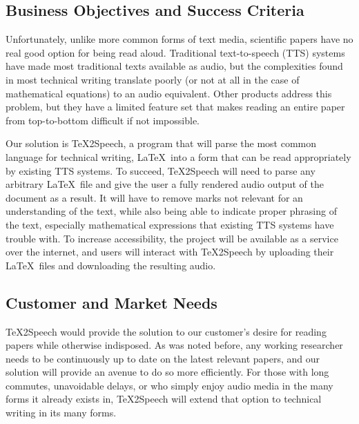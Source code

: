 \subsection{Business Objectives and Success Criteria}
\par
Unfortunately, unlike more common forms of text media, scientific papers have no real good option for being read aloud. Traditional text-to-speech (TTS) systems have made most traditional texts available as audio, but the complexities found in most technical writing translate poorly (or not at all in the case of mathematical equations) to an audio equivalent. Other products address this problem, but they have a limited feature set that makes reading an entire paper from top-to-bottom difficult if not impossible.\\
\par
\noindent Our solution is \TeX 2Speech, a program that will parse the most common language for technical writing, \LaTeX\, into a form that can be read appropriately by existing TTS systems. To succeed, \TeX 2Speech will need to parse any arbitrary \LaTeX\ file and give the user a fully rendered audio output of the document as a result. It will have to remove marks not relevant for an understanding of the text, while also being able to indicate proper phrasing of the text, especially mathematical expressions that existing TTS systems have trouble with. To increase accessibility, the project will be available as a service over the internet, and users will interact with \TeX 2Speech by uploading their \LaTeX\ files and downloading the resulting audio.

\subsection{Customer and Market Needs}
\TeX 2Speech would provide the solution to our customer’s desire for reading papers while otherwise indisposed. As was noted before, any working researcher needs to be continuously up to date on the latest relevant papers, and our solution will provide an avenue to do so more efficiently. For those with long commutes, unavoidable delays, or who simply enjoy audio media in the many forms it already exists in, \TeX 2Speech will extend that option to technical writing in its many forms.

